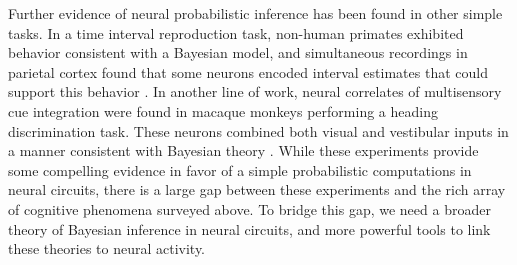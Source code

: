 Further evidence of neural probabilistic inference has been found in
other simple tasks. In a time interval reproduction task, non-human
primates exhibited behavior consistent with a Bayesian model, and
simultaneous recordings in parietal cortex found that some neurons
encoded interval estimates that could support this behavior
\cite{jazayeri2015neural}. In another line of work, neural correlates
of multisensory cue integration were found in macaque monkeys
performing a heading discrimination task. These neurons combined both
visual and vestibular inputs in a manner consistent with Bayesian
theory \cite{gu2008neural, morgan2008multisensory, fetsch2009dynamic,
  fetsch2012neural}.  While these experiments provide some compelling
evidence in favor of a simple probabilistic computations in neural
circuits, there is a large gap between these experiments and the rich
array of cognitive phenomena surveyed above. To bridge this gap, we
need a broader theory of Bayesian inference in neural circuits, and
more powerful tools to link these theories to neural activity.

